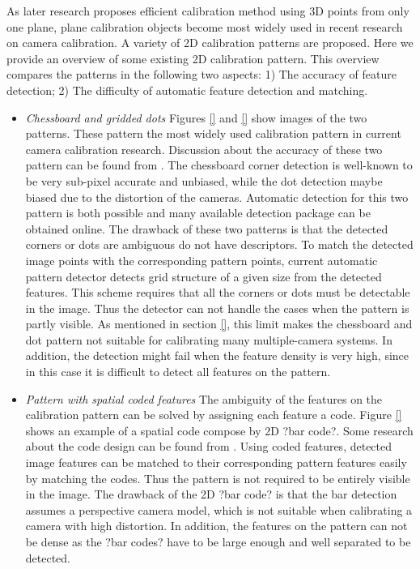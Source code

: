 \documentclass{report}
\begin{document}
As later research proposes efficient calibration method using 3D points from only one plane, plane calibration objects become most widely used in recent research on camera calibration. A variety of 2D calibration patterns are proposed. Here we provide an overview of some existing 2D calibration pattern. This overview compares the patterns in the following two aspects: 1) The accuracy of feature detection; 2) The difficulty of automatic feature detection and matching. 

\begin{itemize}
	\item \textit{Chessboard and gridded dots} Figures \ref{} and \ref{} show images of the two patterns. These pattern the most widely used calibration pattern in current camera calibration research. Discussion about the accuracy of these two pattern can be found from \cite{mallon2007pattern}. The chessboard corner detection is well-known to be very sub-pixel accurate and unbiased, while the dot detection maybe biased due to the distortion of the cameras. Automatic detection for this two pattern is both possible and many available detection package can be obtained online. %
	The drawback of these two patterns is that the detected corners or dots are ambiguous do not have descriptors. To match the detected image points with the corresponding pattern points, current automatic pattern detector detects grid structure of a given size from the detected features. This scheme requires that all the corners or dots must be detectable in the image. Thus the detector can not handle the cases when the pattern is partly visible. As mentioned in section \ref{}, this limit makes the chessboard and dot pattern not suitable for calibrating many multiple-camera systems. In addition, the detection might fail when the feature density is very high, since in this case it is difficult to detect all features on the pattern. 
	\item \textit{Pattern with spatial coded features} The ambiguity of the features on the calibration pattern can be solved by assigning each feature a code. Figure \ref{} shows an example of a spatial code compose by 2D ?bar code?. Some research about the code design can be found from \cite{}. Using coded features, detected image features can be matched to their corresponding pattern features easily by matching the codes. Thus the pattern is not required to be entirely visible in the image. The drawback of the 2D ?bar code? is that the bar detection assumes a perspective camera model, which is not suitable when calibrating a camera with high distortion. In addition, the features on the pattern can not be dense as the ?bar codes? have to be large enough and well separated to be detected. 

\end{itemize}
\end{document}

